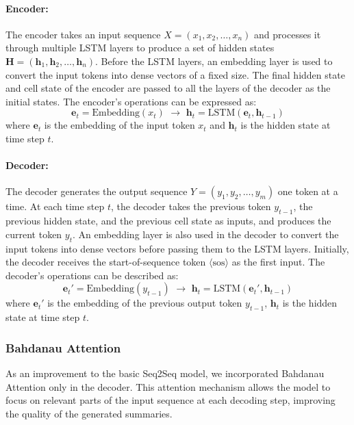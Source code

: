 \paragraph{Encoder:}
The encoder takes an input sequence \( X = (x_1, x_2, \ldots, x_n) \) and processes it through multiple LSTM layers to produce a set of hidden states \( \mathbf{H} = (\mathbf{h}_1, \mathbf{h}_2, \ldots, \mathbf{h}_n) \). Before the LSTM layers, an embedding layer is used to convert the input tokens into dense vectors of a fixed size. The final hidden state and cell state of the encoder are passed to all the layers of the decoder as the initial states. The encoder's operations can be expressed as:
\begin{equation}
    \mathbf{e}_t = \text{Embedding}(x_t) \,\, \rightarrow \,\, \mathbf{h}_t = \text{LSTM}(\mathbf{e}_t, \mathbf{h}_{t-1})
\end{equation}
where \( \mathbf{e}_t \) is the embedding of the input token \( x_t \) and \( \mathbf{h}_t \) is the hidden state at time step \( t \).

\paragraph{Decoder:}
The decoder generates the output sequence \( Y = (y_1, y_2, \ldots, y_m) \) one token at a time. At each time step \( t \), the decoder takes the previous token \( y_{t-1} \), the previous hidden state, and the previous cell state as inputs, and produces the current token \( y_t \). An embedding layer is also used in the decoder to convert the input tokens into dense vectors before passing them to the LSTM layers. Initially, the decoder receives the start-of-sequence token \( \langle \text{sos} \rangle \) as the first input. The decoder's operations can be described as:
\begin{equation}
    \mathbf{e}_t' = \text{Embedding}(y_{t-1}) \,\, \rightarrow \,\, \mathbf{h}_t = \text{LSTM}(\mathbf{e}_t', \mathbf{h}_{t-1})
\end{equation}
where \( \mathbf{e}_t' \) is the embedding of the previous output token \( y_{t-1} \), \( \mathbf{h}_t \) is the hidden state at time step \( t \).

\subsubsection{Bahdanau Attention}

As an improvement to the basic Seq2Seq model, we incorporated Bahdanau Attention\cite{bahdanau2014neural} only in the decoder. This attention mechanism allows the model to focus on relevant parts of the input sequence at each decoding step, improving the quality of the generated summaries.

